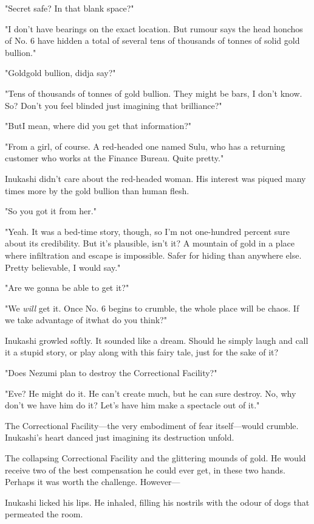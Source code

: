 "Secret safe? In that blank space?"

"I don't have bearings on the exact location. But rumour says the head
honchos of No. 6 have hidden a total of several tens of thousands of
tonnes of solid gold bullion."

"Gold\el gold bullion, didja say?"

"Tens of thousands of tonnes of gold bullion. They might be bars, I
don't know. So? Don't you feel blinded just imagining that brilliance?"

"But\el I mean, where did you get that information?"

"From a girl, of course. A red-headed one named Sulu, who has a
returning customer who works at the Finance Bureau. Quite pretty."

Inukashi didn't care about the red-headed woman. His interest was piqued
many times more by the gold bullion than human flesh.

"So you got it from her."

"Yeah. It was a bed-time story, though, so I'm not one-hundred percent
sure about its credibility. But it's plausible, isn't it? A mountain of
gold in a place where infiltration and escape is impossible. Safer for
hiding than anywhere else. Pretty believable, I would say."

"Are we gonna be able to get it?"

"We \emph{will} get it. Once No. 6 begins to crumble, the whole place will be
chaos. If we take advantage of it\el what do you think?"

Inukashi growled softly. It sounded like a dream. Should he simply laugh
and call it a stupid story, or play along with this fairy tale, just for
the sake of it?

"Does Nezumi plan to destroy the Correctional Facility?"

"Eve? He might do it. He can't create much, but he can sure destroy. No,
why don't we have him do it? Let's have him make a spectacle out of it."

The Correctional Facility---the very embodiment of fear itself---would
crumble. Inukashi's heart danced just imagining its destruction unfold.

The collapsing Correctional Facility and the glittering mounds of gold.
He would receive two of the best compensation he could ever get, in
these two hands. Perhaps it was worth the challenge. However---

Inukashi licked his lips. He inhaled, filling his nostrils with the
odour of dogs that permeated the room.

